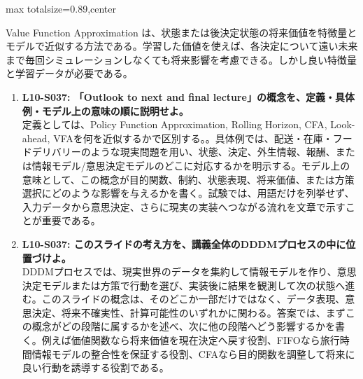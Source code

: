 \begin{minipage}[t]{0.58\textwidth}
\begin{adjustbox}{max totalsize={\textwidth}{0.89\textheight},center}
\begin{minipage}{\textwidth}
Value Function Approximation は、状態または後決定状態の将来価値を特徴量とモデルで近似する方法である。学習した価値を使えば、各決定について遠い未来まで毎回シミュレーションしなくても将来影響を考慮できる。しかし良い特徴量と学習データが必要である。\par{}\begin{enumerate}\item \textbf{L10-S037: 「Outlook to next and final lecture」の概念を、定義・具体例・モデル上の意味の順に説明せよ。}\\定義としては、Policy Function Approximation, Rolling Horizon, CFA, Look-ahead, VFAを何を近似するかで区別する。。具体例では、配送・在庫・フードデリバリーのような現実問題を用い、状態、決定、外生情報、報酬、または情報モデル/意思決定モデルのどこに対応するかを明示する。モデル上の意味として、この概念が目的関数、制約、状態表現、将来価値、または方策選択にどのような影響を与えるかを書く。試験では、用語だけを列挙せず、入力データから意思決定、さらに現実の実装へつながる流れを文章で示すことが重要である。\item \textbf{L10-S037: このスライドの考え方を、講義全体のDDDMプロセスの中に位置づけよ。}\\DDDMプロセスでは、現実世界のデータを集約して情報モデルを作り、意思決定モデルまたは方策で行動を選び、実装後に結果を観測して次の状態へ進む。このスライドの概念は、そのどこか一部だけではなく、データ表現、意思決定、将来不確実性、計算可能性のいずれかに関わる。答案では、まずこの概念がどの段階に属するかを述べ、次に他の段階へどう影響するかを書く。例えば価値関数なら将来価値を現在決定へ戻す役割、FIFOなら旅行時間情報モデルの整合性を保証する役割、CFAなら目的関数を調整して将来に良い行動を誘導する役割である。\end{enumerate}
\end{minipage}
\end{adjustbox}
\end{minipage}

